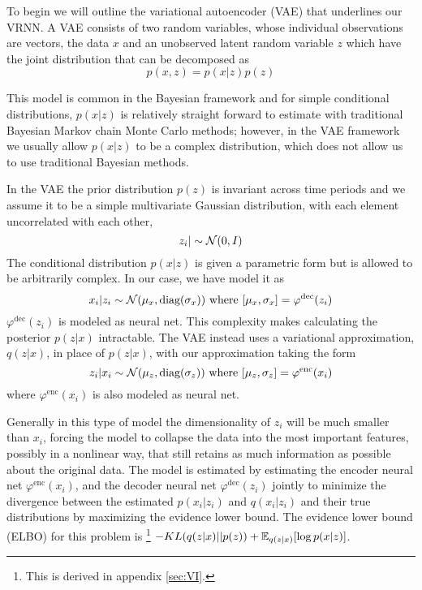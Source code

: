 \documentclass[12pt]{article}
\begin{document}
To begin we will outline the variational autoencoder (VAE) that underlines our VRNN. A VAE consists of two random
variables, whose individual observations are vectors, 
the data $x$ and an unobserved latent random variable $z$ which have the joint distribution that can be decomposed 
as 
\begin{equation}
   p(x,z) = p(x|z) p(z)
\end{equation} 

This model is common in the Bayesian framework and for simple conditional distributions, $p(x|z)$ is relatively straight forward
to estimate with traditional Bayesian Markov chain Monte Carlo methods; however, in the VAE framework we usually allow $p(x|z)$ to 
be a complex distribution, which does not allow us to use traditional Bayesian methods. 

In the VAE the prior distribution $p(z)$ is invariant across time periods and we assume it to be a simple multivariate Gaussian distribution,
with each element uncorrelated with each other,
\begin{equation}
   z_i | \sim \operatorname{\mathcal{N}}(0, I)
\end{equation} 
The conditional distribution $p(x | z)$ is given a parametric form but is allowed to be arbitrarily complex. In our case, we have model it as
\begin{equation}
   x_i | z_i \sim \operatorname{\mathcal{N}}(\mu_{x}, \text{diag}(\sigma_{x})) \text{ where } [\mu_{x}, \sigma_{x} ] = \varphi^{\text{dec}}(z_i)
\end{equation}
$\varphi^{\text{dec}}(z_i)$ is modeled as neural net. 
This complexity makes calculating the posterior $p(z|x)$ intractable. The VAE instead uses a 
variational approximation, $q(z|x)$, in place of $p(z|x)$, with our approximation taking the form 
\begin{equation}
   z_i | x_i \sim \operatorname{\mathcal{N}}(\mu_{z}, \text{diag}(\sigma_{z})) \text{ where } [\mu_{z}, \sigma_{z} ] = \varphi^{\text{enc}}(x_i)
\end{equation}
where $\varphi^{\text{enc}}(x_i)$ is also modeled as neural net. 

Generally in this type of model the dimensionality of $z_i$ will be much smaller than $x_i$, forcing the model
to collapse the data into the most important features, possibly in a nonlinear way, that still retains as much 
information as possible about the original data. The model is estimated by estimating the encoder neural net 
$\varphi^{\text{enc}}(x_i)$, and the decoder neural net $\varphi^{\text{dec}}(z_i)$ jointly to minimize the divergence 
between the estimated $p(x_i|z_i)$ and $q(x_i|z_i)$ and their true distributions by maximizing the evidence lower bound.
The evidence lower bound (ELBO) for this problem is \footnote{This is derived in appendix \ref{sec:VI}.} 
$-KL(q(z|x) || p(z)) + \operatorname{\mathbb{E}}_{q(z|x)}[\log p(x|z)]$. 
\end{document}
